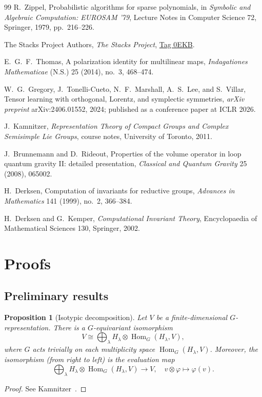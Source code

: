 \documentclass[11pt]{article}
\newcommand{\HomG}[2]{\operatorname{Hom}_G\!\left(#1,#2\right)}
\newtheorem{proposition}[theorem]{Proposition}
\theoremstyle{definition}
\begin{document}
\begin{thebibliography}{99}
  R.~Zippel,
  Probabilistic algorithms for sparse polynomials,
  in \emph{Symbolic and Algebraic Computation: EUROSAM '79},
  Lecture Notes in Computer Science 72,
  Springer, 1979, pp.~216--226.


  The Stacks Project Authors,
  \emph{The Stacks Project},
  \href{https://stacks.math.columbia.edu/tag/0EKB}{Tag 0EKB}.

  E.~G.~F.~Thomas,
  A polarization identity for multilinear maps,
  \emph{Indagationes Mathematicae} (N.S.) 25 (2014), no.~3, 468--474.

  W.~G.~Gregory, J.~Tonelli-Cueto, N.~F.~Marshall, A.~S.~Lee, and S.~Villar,
  Tensor learning with orthogonal, Lorentz, and symplectic symmetries,
  \emph{arXiv preprint} arXiv:2406.01552, 2024; published as a conference paper at ICLR 2026.

  J.~Kamnitzer,
  \emph{Representation Theory of Compact Groups and Complex Semisimple Lie Groups},
  course notes, University of Toronto, 2011.

  J.~Brunnemann and D.~Rideout,
  Properties of the volume operator in loop quantum gravity II: detailed presentation,
  \emph{Classical and Quantum Gravity} 25 (2008), 065002.

  H.~Derksen,
  Computation of invariants for reductive groups,
  \emph{Advances in Mathematics} 141 (1999), no.~2, 366--384.

  H.~Derksen and G.~Kemper,
  \emph{Computational Invariant Theory},
  Encyclopaedia of Mathematical Sciences 130,
  Springer, 2002.

\end{thebibliography}

\appendix

\section{Proofs}\label{sec:appendix-proofs}

\subsection{Preliminary results}


\begin{proposition}[Isotypic decomposition]\label{prop:isotypic-decomposition}
  Let $V$ be a finite-dimensional $G$-representation. There is a $G$-equivariant isomorphism
  \[
    V
    \cong
    \bigoplus_{\lambda}
    H_\lambda\otimes \HomG{H_\lambda}{V},
  \]
  where $G$ acts trivially on each multiplicity space $\HomG{H_\lambda}{V}$. Moreover, the isomorphism (from right to left) is the evaluation map
  \[
    \bigoplus_{\lambda}
    H_\lambda\otimes \HomG{H_\lambda}{V}
    \longrightarrow
    V,
    \quad
    v\otimes \varphi \longmapsto \varphi(v).
  \]
\end{proposition}
\begin{proof}
  See Kamnitzer~\cite[Theorem~1.10 and its proof]{Kamnitzer2011}.
\end{proof}
\end{document}
